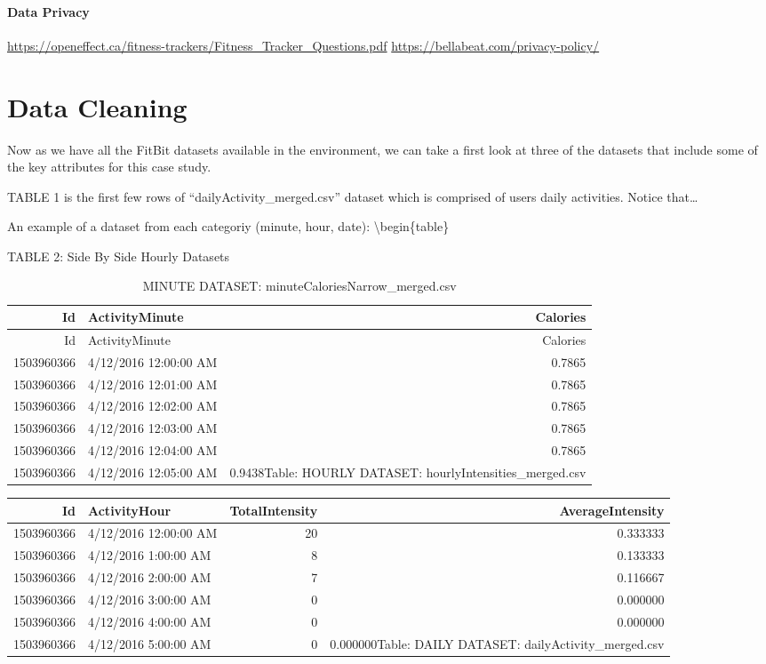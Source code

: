 \documentclass[
]{article}
\begin{document}
\hypertarget{data-privacy}{%
\paragraph{Data Privacy}\label{data-privacy}}

\url{https://openeffect.ca/fitness-trackers/Fitness_Tracker_Questions.pdf}
\url{https://bellabeat.com/privacy-policy/}

\hypertarget{data-cleaning}{%
\section{Data Cleaning}\label{data-cleaning}}

Now as we have all the FitBit datasets available in the environment, we
can take a first look at three of the datasets that include some of the
key attributes for this case study.

TABLE 1 is the first few rows of ``dailyActivity\_merged.csv'' dataset
which is comprised of users daily activities. Notice that\ldots{}

An example of a dataset from each categoriy (minute, hour, date):
\textbackslash begin\{table\}

\caption{\label{tab:unnamed-chunk-3}TABLE 2: Side By Side Hourly Datasets}

\begin{longtable}[]{@{}rlr@{}}
\caption{MINUTE DATASET:
minuteCaloriesNarrow\_merged.csv}\tabularnewline
\toprule
Id & ActivityMinute & Calories\tabularnewline
\midrule
\endfirsthead
\toprule
Id & ActivityMinute & Calories\tabularnewline
\midrule
\endhead
1503960366 & 4/12/2016 12:00:00 AM & 0.7865\tabularnewline
1503960366 & 4/12/2016 12:01:00 AM & 0.7865\tabularnewline
1503960366 & 4/12/2016 12:02:00 AM & 0.7865\tabularnewline
1503960366 & 4/12/2016 12:03:00 AM & 0.7865\tabularnewline
1503960366 & 4/12/2016 12:04:00 AM & 0.7865\tabularnewline
1503960366 & 4/12/2016 12:05:00 AM & 0.9438Table: HOURLY DATASET:
hourlyIntensities\_merged.csv\tabularnewline
\bottomrule
\end{longtable}

\begin{longtable}[]{@{}rlrr@{}}
\toprule
Id & ActivityHour & TotalIntensity & AverageIntensity\tabularnewline
\midrule
\endhead
1503960366 & 4/12/2016 12:00:00 AM & 20 & 0.333333\tabularnewline
1503960366 & 4/12/2016 1:00:00 AM & 8 & 0.133333\tabularnewline
1503960366 & 4/12/2016 2:00:00 AM & 7 & 0.116667\tabularnewline
1503960366 & 4/12/2016 3:00:00 AM & 0 & 0.000000\tabularnewline
1503960366 & 4/12/2016 4:00:00 AM & 0 & 0.000000\tabularnewline
1503960366 & 4/12/2016 5:00:00 AM & 0 & 0.000000Table: DAILY DATASET:
dailyActivity\_merged.csv\tabularnewline
\bottomrule
\end{longtable}
\end{document}
